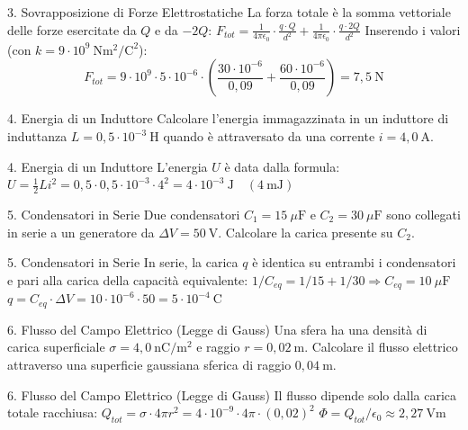 \documentclass[a4paper]{article}
\begin{document}
\begin{snippetsolution}{3. Sovrapposizione di Forze Elettrostatiche}
    La forza totale è la somma vettoriale delle forze esercitate da \(Q\) e da \(-2Q\):
    \(F_{tot} = \frac{1}{4\pi\epsilon_{0}}\cdot\frac{q\cdot Q}{d^{2}} + \frac{1}{4\pi\epsilon_{0}}\cdot\frac{q\cdot 2Q}{d^{2}}\)
    Inserendo i valori (con \(k=9\cdot10^{9}~\mathrm{Nm^{2}/C^{2}}\)):
    \[
    F_{tot} = 9\cdot10^{9} \cdot 5\cdot10^{-6} \cdot \left(\frac{30\cdot10^{-6}}{0,09} + \frac{60\cdot10^{-6}}{0,09}\right) = 7,5~\mathrm{N}
    \]
\end{snippetsolution}
\begin{snippetexercise}{4. Energia di un Induttore}
    Calcolare l'energia immagazzinata in un induttore di induttanza \(L=0,5\cdot10^{-3}~\mathrm{H}\) quando è attraversato da una corrente \(i=4,0~\mathrm{A}\).
\end{snippetexercise}
\begin{snippetsolution}{4. Energia di un Induttore}
    L'energia \(U\) è data dalla formula:
    \(U = \frac{1}{2}Li^{2} = 0,5 \cdot 0,5\cdot10^{-3} \cdot 4^{2} = 4\cdot10^{-3}~\mathrm{J} \quad (4~\mathrm{mJ})\)
\end{snippetsolution}
\begin{snippetexercise}{5. Condensatori in Serie}
    Due condensatori \(C_{1}=15~\mu\mathrm{F}\) e \(C_{2}=30~\mu\mathrm{F}\) sono collegati in serie a un generatore da \(\Delta V=50~\mathrm{V}\). Calcolare la carica presente su \(C_{2}\).
\end{snippetexercise}
\begin{snippetsolution}{5. Condensatori in Serie}
    In serie, la carica \(q\) è identica su entrambi i condensatori e pari alla carica della capacità equivalente:
    \(1/C_{eq} = 1/15 + 1/30 \Rightarrow C_{eq} = 10~\mu\mathrm{F}\)
    \(q = C_{eq} \cdot \Delta V = 10\cdot10^{-6} \cdot 50 = 5\cdot10^{-4}~\mathrm{C}\)
\end{snippetsolution}
\begin{snippetexercise}{6. Flusso del Campo Elettrico (Legge di Gauss)}
    Una sfera ha una densità di carica superficiale \(\sigma=4,0~\mathrm{nC/m^{2}}\) e raggio \(r=0,02~\mathrm{m}\). Calcolare il flusso elettrico attraverso una superficie gaussiana sferica di raggio \(0,04~\mathrm{m}\).
\end{snippetexercise}
\begin{snippetsolution}{6. Flusso del Campo Elettrico (Legge di Gauss)}
    Il flusso dipende solo dalla carica totale racchiusa:
    \(Q_{tot} = \sigma \cdot 4\pi r^{2} = 4\cdot10^{-9} \cdot 4\pi \cdot (0,02)^{2}\)
    \(\Phi = Q_{tot}/\epsilon_{0} \approx 2,27~\mathrm{Vm}\)
\end{snippetsolution}
\end{document}
